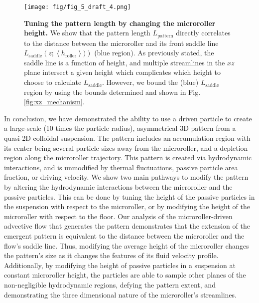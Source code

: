 \documentclass[12pt]{article}
\begin{document}
\begin{figure}%
\centering
\texttt{[image: fig/fig\_5\_draft\_4.png]}
\caption{\textbf{Tuning the pattern length by changing the microroller height.} We show that the pattern length $L_\mathrm{pattern}$ directly correlates to the distance between the microroller and its front saddle line $L_\mathrm{saddle} \left( z ;\left <  h_\mathrm{roller} \right>)\right)$ (blue region). As previously stated, the saddle line is a function of height, and multiple streamlines in the $xz$ plane intersect a given height which complicates which height to choose to calculate $L_\mathrm{saddle}$. However, we bound the (blue) $L_\mathrm{saddle}$ region by using the bounds determined and shown in Fig. \ref{fig:xz_mechanism}.
\\%
}
\label{fig:L}
\end{figure}

In conclusion, we have demonstrated the ability to use a driven particle to create a large-scale (10 times the particle radius), asymmetrical 3D pattern from a quasi-2D colloidal suspension. The pattern includes an accumulation region with its center being several particle sizes away from the microroller, and a depletion region along the microroller trajectory.
This pattern is created via hydrodynamic interactions, and is unmodified by thermal fluctuations, passive particle area fraction, or driving velocity. 
%
We show two main pathways to modify the pattern by altering the hydrodynamic interactions between the microroller and the passive particles. This can be done by tuning the height of the passive particles in the suspension with respect to the microroller, or by modifying the height of the microroller with respect to the floor. 
%
Our analysis of the microroller-driven advective flow that generates the pattern demonstrates that the extension of the emergent pattern is equivalent to the distance between the microroller and the flow's saddle line. Thus, modifying the average height of the microroller changes the pattern's size as it changes the features of its fluid velocity profile. Additionally, by modifying the height of passive particles in a suspension at constant microroller height, the particles are able to sample other planes of the non-negligible hydrodynamic regions, defying the pattern extent, and demonstrating the three dimensional nature of the microroller's streamlines. 
\end{document}
